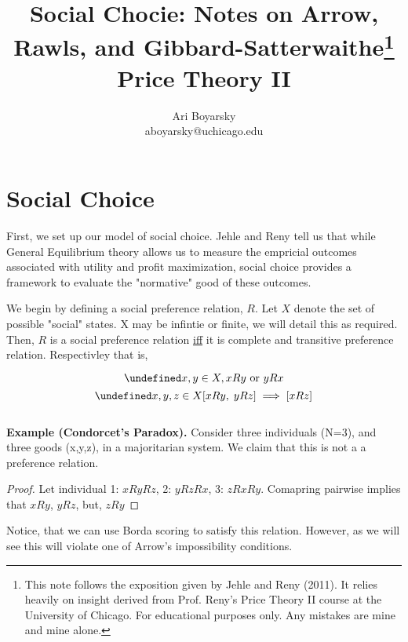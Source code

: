 \documentclass[dvips,11pt]{article}
\let\oldforall\forall
\let\forall\undefined
\DeclareMathOperator{\forall}{\,\oldforall\,}
\DeclareMathOperator{\?}{\,?\,}
\begin{document}

\title{\vspace{-100pt}Social Chocie: Notes on Arrow, Rawls, and Gibbard-Satterwaithe\footnote{This note follows the exposition given by Jehle and Reny (2011). It relies heavily on insight derived from Prof. Reny's Price Theory II course at the University of Chicago. For educational purposes only. Any mistakes are mine and mine alone.} \\ Price Theory II}
\author{Ari Boyarsky \\ aboyarsky@uchicago.edu}

\maketitle

\section{Social Choice}
First, we set up our model of social choice. Jehle and Reny tell us that while General Equilibrium theory allows us to measure the empricial outcomes associated with utility and profit maximization, social choice provides a framework to evaluate the "normative" good of these outcomes. 

We begin by defining a social preference relation, $R$. Let $X$ denote the set of possible "social" states. X may be infintie or finite, we will detail this as required. Then, $R$ is a social preference relation \underline{iff} it is complete and transitive preference relation. Respectivley that is,

$$\forall x,y \in X, xRy \text{ or } yRx$$
$$\forall x,y,z \in X [xRy, \; yRz] \implies [xRz]$$
\\\textbf{Example (Condorcet's Paradox).} Consider three individuals (N=3), and three goods (x,y,z), in a majoritarian system. We claim that this is not a a preference relation.
\begin{proof}
Let individual 1: $xRyRz$, 2: $yRzRx$, 3: $zRxRy$. Comapring pairwise implies that $xRy$, $yRz$, but, $zRy$
\end{proof}
Notice, that we can use Borda scoring to satisfy this relation. However, as we will see this will violate one of Arrow's impossibility conditions.
\end{document}
